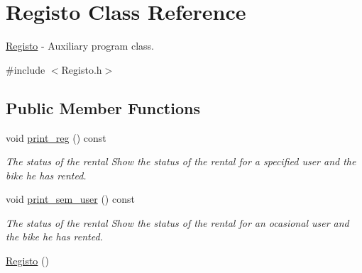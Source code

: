 \hypertarget{class_registo}{\section{Registo Class Reference}
\label{class_registo}
}


\hyperlink{class_registo}{Registo} -\/ Auxiliary program class.  




{\ttfamily \#include $<$Registo.\+h$>$}

\subsection*{Public Member Functions}
\begin{DoxyCompactItemize}
\item 
\hypertarget{class_registo_a17d5d8a67903e30624817b5798c6065e}{void \hyperlink{class_registo_a17d5d8a67903e30624817b5798c6065e}{print\+\_\+reg} () const }\label{class_registo_a17d5d8a67903e30624817b5798c6065e}

\begin{DoxyCompactList}\small\item\em The status of the rental Show the status of the rental for a specified user and the bike he has rented. \end{DoxyCompactList}\item 
\hypertarget{class_registo_a80d93fbe1e4ea760aea6e3cf74a8bcce}{void \hyperlink{class_registo_a80d93fbe1e4ea760aea6e3cf74a8bcce}{print\+\_\+sem\+\_\+user} () const }\label{class_registo_a80d93fbe1e4ea760aea6e3cf74a8bcce}

\begin{DoxyCompactList}\small\item\em The status of the rental Show the status of the rental for an ocasional user and the bike he has rented. \end{DoxyCompactList}\item 
\hypertarget{class_registo_a30542f121d8c2edc83613e30d3d3ec74}{\hyperlink{class_registo_a30542f121d8c2edc83613e30d3d3ec74}{Registo} ()}\label{class_registo_a30542f121d8c2edc83613e30d3d3ec74}


\end{DoxyCompactItemize}
